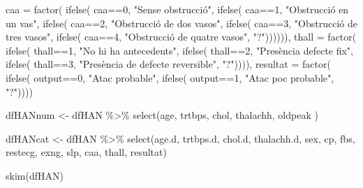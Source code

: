 \documentclass[
]{article}
\newenvironment{Shaded}{\begin{snugshade}}{\end{snugshade}}
\newcommand{\AttributeTok}[1]{\textcolor[rgb]{0.80,0.80,0.80}{#1}}
\newcommand{\DecValTok}[1]{\textcolor[rgb]{0.86,0.86,0.80}{#1}}
\newcommand{\FunctionTok}[1]{\textcolor[rgb]{0.94,0.94,0.56}{#1}}
\newcommand{\NormalTok}[1]{\textcolor[rgb]{0.80,0.80,0.80}{#1}}
\newcommand{\OtherTok}[1]{\textcolor[rgb]{0.94,0.94,0.56}{#1}}
\newcommand{\SpecialCharTok}[1]{\textcolor[rgb]{0.86,0.64,0.64}{#1}}
\newcommand{\StringTok}[1]{\textcolor[rgb]{0.80,0.58,0.58}{#1}}
\begin{document}
\begin{Shaded}
\begin{Highlighting}[]
          \AttributeTok{caa =} \FunctionTok{factor}\NormalTok{( }\FunctionTok{ifelse}\NormalTok{( caa}\SpecialCharTok{==}\DecValTok{0}\NormalTok{, }\StringTok{"Sense obstrucció"}\NormalTok{,}
                        \FunctionTok{ifelse}\NormalTok{( caa}\SpecialCharTok{==}\DecValTok{1}\NormalTok{, }\StringTok{"Obstrucció en un vas"}\NormalTok{,}
                        \FunctionTok{ifelse}\NormalTok{( caa}\SpecialCharTok{==}\DecValTok{2}\NormalTok{, }\StringTok{"Obstrucció de dos vasos"}\NormalTok{,}
                        \FunctionTok{ifelse}\NormalTok{( caa}\SpecialCharTok{==}\DecValTok{3}\NormalTok{, }\StringTok{"Obstrucció de tres vasos"}\NormalTok{,}
                        \FunctionTok{ifelse}\NormalTok{( caa}\SpecialCharTok{==}\DecValTok{4}\NormalTok{, }\StringTok{"Obstrucció de quatre vasos"}\NormalTok{, }\StringTok{"?"}\NormalTok{)))))),}
          \AttributeTok{thall =} \FunctionTok{factor}\NormalTok{( }\FunctionTok{ifelse}\NormalTok{( thall}\SpecialCharTok{==}\DecValTok{1}\NormalTok{, }\StringTok{"No hi ha antecedents"}\NormalTok{,}
                          \FunctionTok{ifelse}\NormalTok{( thall}\SpecialCharTok{==}\DecValTok{2}\NormalTok{, }\StringTok{"Presència defecte fix"}\NormalTok{,}
                          \FunctionTok{ifelse}\NormalTok{( thall}\SpecialCharTok{==}\DecValTok{3}\NormalTok{, }\StringTok{"Presència de defecte reversible"}\NormalTok{, }\StringTok{"?"}\NormalTok{)))),}
          \AttributeTok{resultat =} \FunctionTok{factor}\NormalTok{( }\FunctionTok{ifelse}\NormalTok{( output}\SpecialCharTok{==}\DecValTok{0}\NormalTok{, }\StringTok{"Atac probable"}\NormalTok{,}
                             \FunctionTok{ifelse}\NormalTok{( output}\SpecialCharTok{==}\DecValTok{1}\NormalTok{, }\StringTok{"Atac poc probable"}\NormalTok{, }\StringTok{"?"}\NormalTok{))))}

\NormalTok{dfHANnum }\OtherTok{\textless{}{-}}\NormalTok{ dfHAN }\SpecialCharTok{\%\textgreater{}\%} 
  \FunctionTok{select}\NormalTok{(age, trtbps, chol, thalachh, oldpeak )}

\NormalTok{dfHANcat }\OtherTok{\textless{}{-}}\NormalTok{ dfHAN }\SpecialCharTok{\%\textgreater{}\%} 
  \FunctionTok{select}\NormalTok{(age.d, trtbps.d, chol.d, thalachh.d, sex, cp, fbs, restecg, exng, slp, caa, thall, resultat)}

\FunctionTok{skim}\NormalTok{(dfHAN)}
\end{Highlighting}
\end{Shaded}
\end{document}
